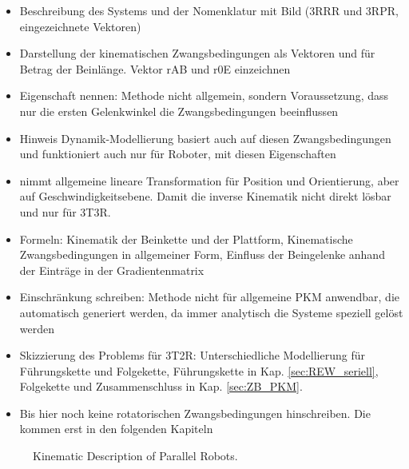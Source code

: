 \documentclass[robotics,article,submit,moreauthors,pdftex]{Definitions/mdpi}
\begin{document}
\begin{itemize}
    \item Beschreibung des Systems und der Nomenklatur mit Bild (3RRR und 3RPR, eingezeichnete Vektoren)
    \item Darstellung der kinematischen Zwangsbedingungen als Vektoren und für Betrag der Beinlänge. Vektor rAB und r0E einzeichnen
    \item Eigenschaft nennen: Methode nicht allgemein, sondern Voraussetzung, dass nur die ersten Gelenkwinkel die Zwangsbedingungen beeinflussen
    \item Hinweis Dynamik-Modellierung basiert auch auf diesen Zwangsbedingungen \cite{Merlet2006,BriotKha2015,AbdellatifHei2009,DoThanhKotHeiOrt2009b} und funktioniert auch nur für Roboter, mit diesen Eigenschaften
    \item \cite{Gogu2008} nimmt allgemeine lineare Transformation für Position und Orientierung, aber auf Geschwindigkeitsebene. Damit die inverse Kinematik nicht direkt lösbar und nur für 3T3R.
    \item Formeln: Kinematik der Beinkette und der Plattform, Kinematische Zwangsbedingungen in allgemeiner Form, Einfluss der Beingelenke anhand der Einträge in der Gradientenmatrix
    \item Einschränkung schreiben: Methode nicht für allgemeine PKM anwendbar, die automatisch generiert werden, da immer analytisch die Systeme speziell gelöst werden
    \item Skizzierung des Problems für 3T2R: Unterschiedliche Modellierung für Führungskette und Folgekette, Führungskette in Kap. \ref{sec:REW_seriell}, Folgekette und Zusammenschluss in Kap. \ref{sec:ZB_PKM}.
    \item Bis hier noch keine rotatorischen Zwangsbedingungen hinschreiben. Die kommen erst in den folgenden Kapiteln
\end{itemize}

\begin{figure}[tb]
    
    \caption{Kinematic Description of Parallel Robots.}
    \label{fig:pkm_constr_transl}
\end{figure} 
\end{document}
